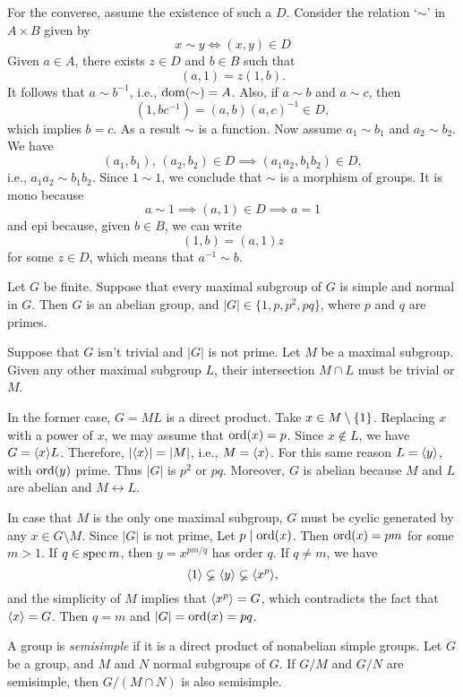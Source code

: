 \begin{solution}
\begin{solution}
For the converse, assume the existence of such a $D$. Consider the relation `$\sim$' in $A\times B$ given by
$$
    x\sim y \iff (x,y)\in D
$$
Given $a\in A$, there exists $z\in D$ and $b\in B$ such that
$$
    (a,1)=z(1,b).
$$
It follows that $a\sim b^{-1}$, i.e., $\operatorname{dom}(\sim)=A$. Also, if $a\sim b$ and $a\sim c$, then
$$
    (1,bc^{-1})=(a,b)(a,c)^{-1}\in D,
$$
which implies $b=c$. As a result $\sim$ is a function. Now assume $a_1\sim b_1$ and $a_2\sim b_2$. We have
$$
    (a_1,b_1),\,(a_2,b_2)\in D\implies (a_1a_2,b_1b_2)\in D,
$$
i.e., $a_1a_2\sim b_1b_2$. Since $1\sim1$, we conclude that $\sim$ is a morphism of groups. It is mono because
$$
    a\sim 1\implies (a,1)\in D\implies a=1
$$
and epi because, given $b\in B$, we can write
$$
    (1,b) = (a,1)z
$$
for some $z\in D$, which means that $a^{-1}\sim b$.  \end{solution}

\begin{exr}
    Let\/ $G$ be finite. Suppose that every maximal subgroup of\/ $G$ is simple and normal in\/ $G$. Then\/ $G$ is an abelian group, and\/ $|G| \in \{1, p, p^2, pq\}$, where\/ $p$ and\/ $q$ are primes.
\end{exr}

\begin{solution} Suppose that $G$ isn't trivial and $|G|$ is not prime. Let $M$ be a maximal subgroup. Given any other maximal subgroup $L$, their intersection $M\cap L$ must be trivial or $M$.

In the former case, $G=ML$ is a direct product. Take $x\in M\setminus\{1\}$. Replacing $x$ with a power of $x$, we may assume that ${\rm ord}(x)=p$. Since $x\notin L$, we have $G=\langle x\rangle L$. Therefore, $|\langle x\rangle|=|M|$, i.e., $M=\langle x\rangle$. For this same reason $L=\langle y\rangle$, with ${\rm ord}(y)$ prime. Thus $|G|$ is $p^2$ or $pq$. Moreover, $G$ is abelian because $M$ and $L$ are abelian and $M\leftrightarrow L$.

In case that $M$ is the only one maximal subgroup, $G$ must be cyclic generated by any $x\in G\setminus M$. Since $|G|$ is not prime, Let $p\mid{\rm ord}(x)$. Then ${\rm ord}(x)=pm$ for some $m>1$. If $q\in\operatorname{spec}m$, then $y=x^{pm/q}$ has order $q$. If $q\ne m$, we have
$$
    \langle1\rangle\varsubsetneq\langle y\rangle\varsubsetneq\langle x^p\rangle,
$$
and the simplicity of $M$ implies that $\langle x^p\rangle=G$, which contradicts the fact that $\langle x\rangle=G$. Then $q=m$ and $|G|={\rm ord}(x)=pq$.  \end{solution}


\begin{exr}
    A group is \textsl{semisimple} if it is a direct product of nonabelian simple groups. Let\/ $G$ be a group, and\/ $M$ and\/ $N$ normal subgroups of\/ $G$. If\/ $G/M$ and\/ $G/N$ are semisimple, then\/ $G/(M \cap N)$ is also semisimple.
\end{exr}


\end{solution}
